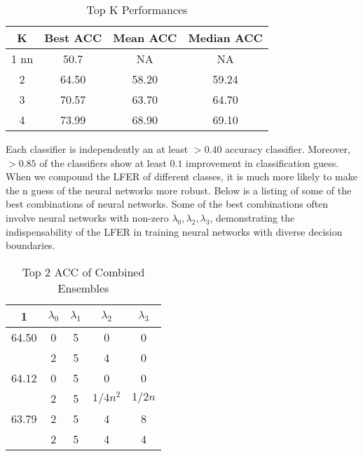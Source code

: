 \documentclass[journal]{journal}
\begin{document}
\begin{table}[h]
\centering

\label{tab:tabela1}
\begin{tabular}{|c|c|c|c|}
\hline
K & Best ACC & Mean ACC & Median ACC  \\ \hline
1 nn & 50.7 & NA & NA \\
2  & 64.50 & 58.20 & 59.24 \\
3  & 70.57 & 63.70 & 64.70 \\
4  & 73.99 & 68.90 & 69.10 \\
\hline
\end{tabular}
\caption{Top K Performances}
\end{table}
Each classifier is independently an at least $> 0.40$ accuracy classifier. Moreover, $>0.85$ of the classifiers show at least $0.1$ improvement in classification guess. When we compound the LFER of different classes, it is much more likely to make the n guess of the neural networks more robust. Below is a listing of some of the best combinations of neural networks. Some of the best combinations often involve neural networks with non-zero $\lambda_{0}, \lambda_{2}, \lambda_{3}$, demonstrating the indispensability of the LFER in training neural networks with diverse decision boundaries. 
\begin{table}[ht]

\begin{center}
\begin{tabular}{|c|c|c|c|c|}
 \hline
    \multirow{ 4}{*}{1}
   
      Top 2 ACC & $\lambda_{0}$ & $\lambda_{1}$ & $\lambda_{2}$ & $\lambda_{3}$ \\
     \hline
      64.50  & 0 & 5 & 0 & 0 \\
    & 2 & 5 & 4 & 0\\
    \hline
   64.12 & 0 & 5 & 0 & 0 \\
    & 2 & 5 & $1 /4n^2$ & $1/2n$ \\
    \hline
   63.79 & 2 & 5 & 4 & 8 \\
    & 2 & 5 & 4 & 4\\ \hline
\end{tabular}
\end{center}
\label{tab:multicol}
\caption{Top 2 ACC of Combined Ensembles}
\end{table}
\end{document}
